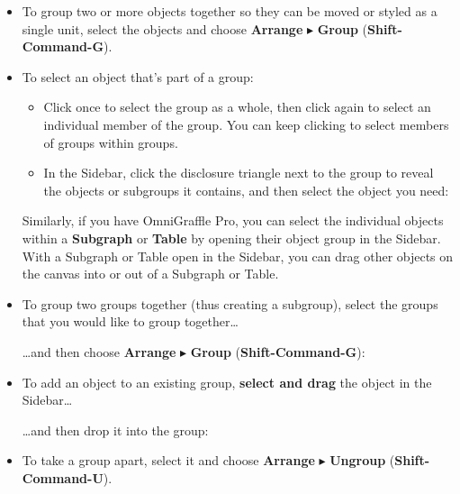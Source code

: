 \documentclass[../main.tex]{subfiles}
\begin{document}
\begin{itemize}
  \item To group two or more objects together so they can be moved or styled as a single unit,
    select the objects and choose \textbf{Arrange} $\blacktriangleright$ \textbf{Group}
    (\textbf{Shift-Command-G}).

  \item To select an object that's part of a group:

    \begin{itemize}
      \item Click once to select the group as a whole, then click again to select an individual
        member of the group. You can keep clicking to select members of groups within groups.
    \end{itemize}


    \begin{itemize}
      \item In the Sidebar, click the disclosure triangle next to the group to reveal the objects
        or subgroups it contains, and then select the object you need:
    \end{itemize}


    \begin{ogtip}
      Similarly, if you have OmniGraffle Pro, you can select the individual objects within a
      \textbf{Subgraph} or \textbf{Table} by opening their object group in the Sidebar. With a
      Subgraph or Table open in the Sidebar, you can drag other objects on the canvas into or out
      of a Subgraph or Table.
    \end{ogtip}
  \item To group two groups together (thus creating a subgroup), select the groups that you
    would like to group together\ldots{}


    \ldots{}and then choose \textbf{Arrange} $\blacktriangleright$ \textbf{Group}
    (\textbf{Shift-Command-G}):

  \item To add an object to an existing group, \textbf{select and drag} the object in the
    Sidebar\ldots{}


    \ldots{}and then drop it into the group:

  \item To take a group apart, select it and choose \textbf{Arrange} $\blacktriangleright$
    \textbf{Ungroup} (\textbf{Shift-Command-U}).
\end{itemize}
\end{document}
